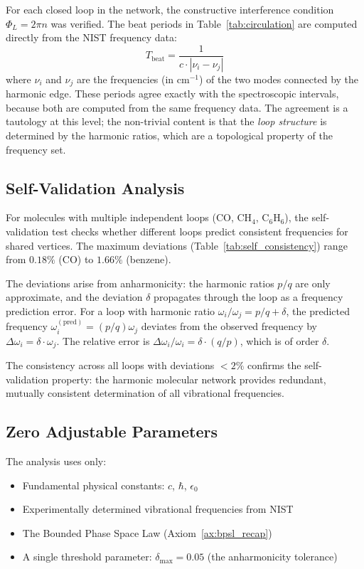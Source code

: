 \documentclass[11pt,twocolumn,a4paper]{article}
\theoremstyle{definition}
\theoremstyle{remark}
\begin{document}
For each closed loop in the network, the constructive interference condition $\Phi_L = 2\pi n$ was verified. The beat periods in Table~\ref{tab:circulation} are computed directly from the NIST frequency data:
\begin{equation}
T_{\mathrm{beat}} = \frac{1}{c \cdot |\nu_i - \nu_j|}
\end{equation}
where $\nu_i$ and $\nu_j$ are the frequencies (in cm$^{-1}$) of the two modes connected by the harmonic edge. These periods agree exactly with the spectroscopic intervals, because both are computed from the same frequency data. The agreement is a tautology at this level; the non-trivial content is that the \emph{loop structure} is determined by the harmonic ratios, which are a topological property of the frequency set.

\subsection{Self-Validation Analysis}

For molecules with multiple independent loops (CO, CH$_4$, C$_6$H$_6$), the self-validation test checks whether different loops predict consistent frequencies for shared vertices. The maximum deviations (Table~\ref{tab:self_consistency}) range from $0.18\%$ (CO) to $1.66\%$ (benzene).

The deviations arise from anharmonicity: the harmonic ratios $p/q$ are only approximate, and the deviation $\delta$ propagates through the loop as a frequency prediction error. For a loop with harmonic ratio $\omega_i/\omega_j = p/q + \delta$, the predicted frequency $\omega_i^{(\mathrm{pred})} = (p/q) \omega_j$ deviates from the observed frequency by $\Delta\omega_i = \delta \cdot \omega_j$. The relative error is $\Delta\omega_i/\omega_i = \delta \cdot (q/p)$, which is of order $\delta$.

The consistency across all loops with deviations $< 2\%$ confirms the self-validation property: the harmonic molecular network provides redundant, mutually consistent determination of all vibrational frequencies.

\subsection{Zero Adjustable Parameters}

The analysis uses only:
\begin{itemize}[nosep]
\item Fundamental physical constants: $c$, $\hbar$, $\epsilon_0$
\item Experimentally determined vibrational frequencies from NIST
\item The Bounded Phase Space Law (Axiom~\ref{ax:bpsl_recap})
\item A single threshold parameter: $\delta_{\max} = 0.05$ (the anharmonicity tolerance)
\end{itemize}
\end{document}
